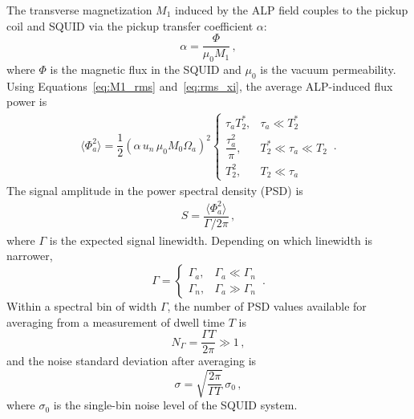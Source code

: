 The transverse magnetization $M_1$ induced by the ALP field couples to the pickup coil and SQUID via the pickup transfer coefficient $\alpha$:
\begin{equation}
    \alpha = \dfrac{\Phi}{\mu_0 M_1}
    \,,\label{eq:alpha}
\end{equation}
where $\Phi$ is the magnetic flux in the SQUID and $\mu_0$ is the vacuum permeability. Using Equations~\eqref{eq:M1_rms} and~\eqref{eq:rms_xi}, the average ALP-induced flux power is
\begin{align}
    \langle \Phi_a^2 \rangle
    =\dfrac{1}{2}(\alpha\, u_n\, \mu_0 M_0 \Omega_a)^2 \left\{
    \begin{array}{cl}
    \tau_a T_2^* ,
    &  \tau_a \ll T_2^*\\[6pt]
    \dfrac{\tau_a^2}{\pi} ,
    &  T_2^*\ll\tau_a \ll T_2\\[6pt]
    T_2^2 ,
    &  T_2 \ll \tau_a
    \end{array} \right.
    \,. \label{eq:Phia2}
\end{align}
The signal amplitude in the power spectral density (PSD) is
\begin{align}
    S = \dfrac{\langle \Phi_a^2 \rangle}{\Gamma /2\pi}
    \,, \label{eq:S_PSD}
\end{align}
where $\Gamma$ is the expected signal linewidth. Depending on which linewidth is narrower,
\begin{equation}
    \Gamma = \left\{
    \begin{array}{cl}
    \Gamma_a ,
    &  \Gamma_a \ll \Gamma_{n}\\[4pt]
    \Gamma_{n},
    & \Gamma_a  \gg \Gamma_{n}
    \end{array} \right.
    \,.\label{eq:Gamma_signal}
\end{equation}
Within a spectral bin of width $\Gamma$, the number of PSD values available for averaging from a measurement of dwell time $T$ is
\begin{equation}
    N_{\Gamma} = \dfrac{\Gamma T}{2\pi} \gg 1
    \,,\label{eq:NGamma}
\end{equation}
and the noise standard deviation after averaging is
\begin{equation}
    \sigma = \sqrt{\dfrac{2\pi}{\Gamma T}}\,\sigma_{0}
    \,,\label{eq:sigma}
\end{equation}
where $\sigma_{0}$ is the single-bin noise level of the SQUID system.

